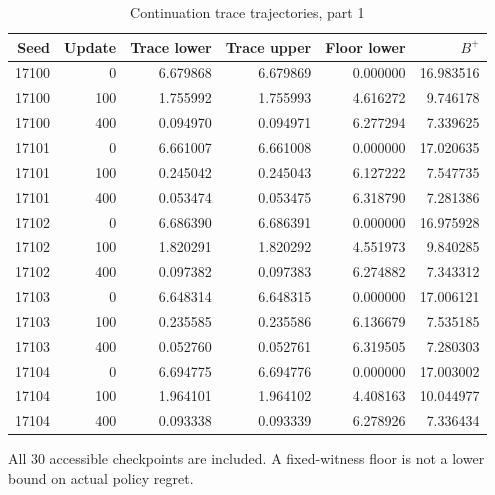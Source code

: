\begin{table}[htbp]
\centering\small
\caption{Continuation trace trajectories, part 1}\label{tab:r19traces0}
\begin{tabular}{rrrrrr}\toprule
Seed & Update & Trace lower & Trace upper & Floor lower & $B^+$\\
\midrule
17100 & 0 & 6.679868 & 6.679869 & 0.000000 & 16.983516\\
17100 & 100 & 1.755992 & 1.755993 & 4.616272 & 9.746178\\
17100 & 400 & 0.094970 & 0.094971 & 6.277294 & 7.339625\\
17101 & 0 & 6.661007 & 6.661008 & 0.000000 & 17.020635\\
17101 & 100 & 0.245042 & 0.245043 & 6.127222 & 7.547735\\
17101 & 400 & 0.053474 & 0.053475 & 6.318790 & 7.281386\\
17102 & 0 & 6.686390 & 6.686391 & 0.000000 & 16.975928\\
17102 & 100 & 1.820291 & 1.820292 & 4.551973 & 9.840285\\
17102 & 400 & 0.097382 & 0.097383 & 6.274882 & 7.343312\\
17103 & 0 & 6.648314 & 6.648315 & 0.000000 & 17.006121\\
17103 & 100 & 0.235585 & 0.235586 & 6.136679 & 7.535185\\
17103 & 400 & 0.052760 & 0.052761 & 6.319505 & 7.280303\\
17104 & 0 & 6.694775 & 6.694776 & 0.000000 & 17.003002\\
17104 & 100 & 1.964101 & 1.964102 & 4.408163 & 10.044977\\
17104 & 400 & 0.093338 & 0.093339 & 6.278926 & 7.336434\\
\bottomrule
\end{tabular}
\par\smallskip\begin{minipage}{.98\textwidth}\footnotesize All 30 accessible checkpoints are included. A fixed-witness floor is not a lower bound on actual policy regret.\end{minipage}
\end{table}
